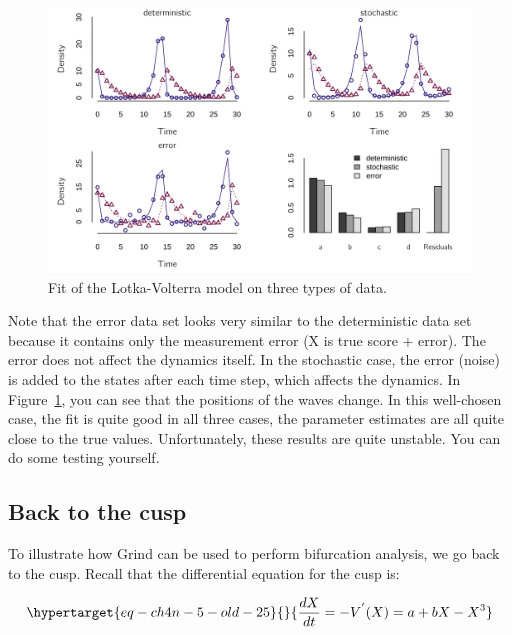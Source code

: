 \documentclass[
  a4paper,
  DIV=11,
  numbers=noendperiod,
  oneside]{scrreprt}
\begin{document}
\begin{figure}

{\centering \includegraphics{media/ch4n/fig-ch4n-img1-old-49.png}

}

\caption{\label{fig-ch4n-img1-old-49}Fit of the Lotka-Volterra model on
three types of data.}

\end{figure}

Note that the error data set looks very similar to the deterministic
data set because it contains only the measurement error (X is true score
+ error). The error does not affect the dynamics itself. In the
stochastic case, the error (noise) is added to the states after each
time step, which affects the dynamics. In
Figure~\ref{fig-ch4n-img1-old-49}, you can see that the positions of the
waves change. In this well-chosen case, the fit is quite good in all
three cases, the parameter estimates are all quite close to the true
values. Unfortunately, these results are quite unstable. You can do some
testing yourself.

\hypertarget{sec-Back-to-the-cusp}{%
\subsection{Back to the cusp}\label{sec-Back-to-the-cusp}}

To illustrate how Grind can be used to perform bifurcation analysis, we
go back to the cusp. Recall that the differential equation for the cusp
is:

\begin{equation}\protect\hypertarget{eq-ch4n-5-old-25}{}{
\frac{dX}{dt} = - V^{'}(X) = {a + bX - X}^{3}
}\label{eq-ch4n-5-old-25}\end{equation}
\end{document}
